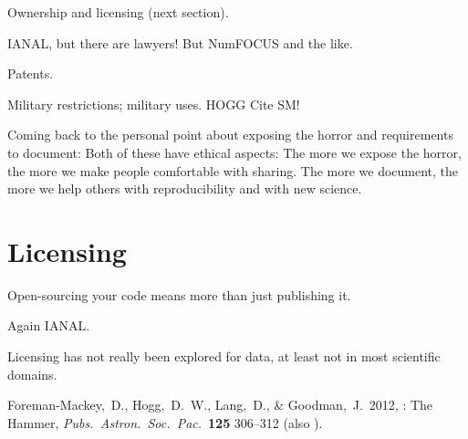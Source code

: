 \documentclass[12pt,twoside,pdftex]{article}
\begin{document}
Ownership and licensing (next section).

IANAL, but there are lawyers! But NumFOCUS and the like.

Patents.

Military restrictions; military uses. HOGG Cite SM!

Coming back to the personal point about exposing the horror and
requirements to document: Both of these have ethical aspects: The more
we expose the horror, the more we make people comfortable with
sharing. The more we document, the more we help others with
reproducibility and with new science.

\section{Licensing}

Open-sourcing your code means more than just publishing it.

Again IANAL.

Licensing has not really been explored for data, at least not in most
scientific domains.

\clearpage
{}\theendnotes

\clearpage
\raggedright
\begin{thebibliography}{}
  Foreman-Mackey,~D., Hogg,~D.~W., Lang,~D., \& Goodman,~J.\ 2012,
  : The  Hammer,
  \textit{Pubs.\ Astron.\ Soc.\ Pac.}\ \textbf{125} 306--312
  (also ).
\end{thebibliography}
\end{document}
